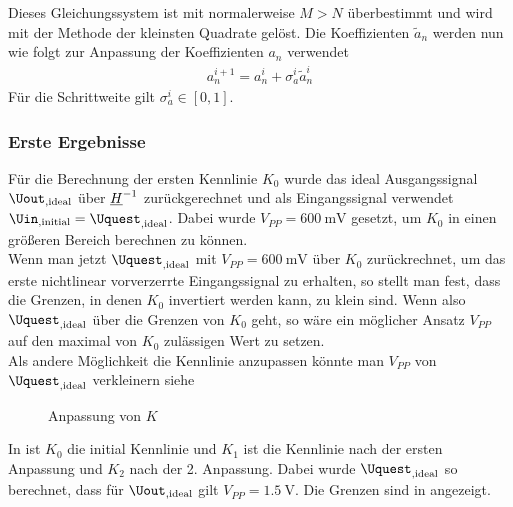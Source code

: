\documentclass[../Report.tex]{subfiles}
\begin{document}
Dieses Gleichungssystem ist mit normalerweise $M>N$ überbestimmt und wird mit der Methode der kleinsten Quadrate gelöst. Die Koeffizienten $\tilde{a}_n$ werden nun wie folgt zur Anpassung der Koeffizienten $a_n$ verwendet
\begin{align}
	\label{eq:opt.adjusta}
	a_n^{i+1} = a_n^{i} + \sigma_{a}^{i} \tilde{a}_n^{i}
\end{align}
Für die Schrittweite gilt $\sigma_{a}^i \in \left[ 0 , 1 \right]$.

\subsubsection*{Erste Ergebnisse}
\label{subsubsec:opt.adjusta.results}
Für die Berechnung der ersten Kennlinie $K_0$ wurde das ideal Ausgangssignal $\Uout_{, \mathrm{ideal}}$ über $\underline{H}^{-1}$ zurückgerechnet und als Eingangssignal verwendet $\Uin_{, \mathrm{initial }} = \Uquest_{, \mathrm{ideal}}$. Dabei wurde $V_{PP} = \SI{600}{\mV}$ gesetzt, um $K_0$ in einen größeren Bereich berechnen zu können.\\
Wenn man jetzt $\Uquest_{, \mathrm{ideal}}$ mit $V_{PP} = \SI{600}{\mV}$ über $K_0$ zurückrechnet, um das erste nichtlinear vorverzerrte Eingangssignal zu erhalten, so stellt man fest, dass die Grenzen, in denen $K_0$ invertiert werden kann, zu klein sind. Wenn also $\Uquest_{, \mathrm{ideal}}$ über die Grenzen von $K_0$ geht, so wäre ein möglicher Ansatz $V_{PP}$ auf den maximal von $K_0$ zulässigen Wert zu setzen.\\
Als andere Möglichkeit die Kennlinie anzupassen könnte man $V_{PP}$ von $\Uquest_{, \mathrm{ideal}}$ verkleinern siehe 
\begin{figure}[H]
\begin{subfigure}{0.5 \textwidth}
    \newlength\figureheight
	\newlength\figurewidth
	\setlength\figureheight{8cm}
	\setlength\figurewidth{8cm}
		
	\label{fig:K}
\end{subfigure}
\begin{subfigure}{0.5 \textwidth}
	\setlength\figureheight{8cm}
	\setlength\figurewidth{8cm}
    
	\label{fig:Uout}
\end{subfigure}
\label{fig:opt.Kennlinie}
\caption{Anpassung von $K$}
\end{figure}
In  ist $K_0$ die initial Kennlinie und $K_1$ ist die Kennlinie nach der ersten Anpassung und $K_2$ nach der 2. Anpassung. Dabei wurde $\Uquest_{, \mathrm{ideal}}$ so berechnet, dass für $\Uout_{, \mathrm{ideal}}$ gilt $V_{PP} = \SI{1,5}{\V}$. Die Grenzen sind in  angezeigt.
\end{document}
